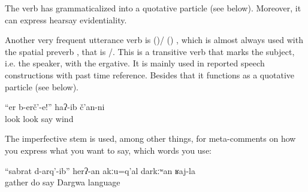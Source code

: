 The verb has grammaticalized into a quotative particle (see below). Moreover, it can express hearsay evidentiality.

Another very frequent utterance verb is  ()\slash{} () , which is almost always used with the spatial preverb  , that is \slash{}. This is a transitive verb that marks the subject, i.e. the speaker, with the ergative. It is mainly used in reported speech constructions with past time reference. Besides that it functions as a quotative particle (see below).
%
\begin{exe}
	\ex	\label{ex:‎‎Look!, said the wind}
	\gll	``er	b-erč'-e!''	haʔ-ib	č'an-ni\\
		look	look	say	wind\\
	\glt	{}
\end{exe}

The imperfective stem is used, among other things, for meta-comments on how you express what you want to say, which words you use:
%
\begin{exe}
	\ex	\label{ex:Gather did, you should not say in Dargwa}
	\gll	``sabrat		d-arq'-ib''	herʔ-an	akːu=q'al	darkːʷan	ʁaj-la	\\
		gather	do	say		Dargwa	language\\
	\glt	{}
\end{exe}

